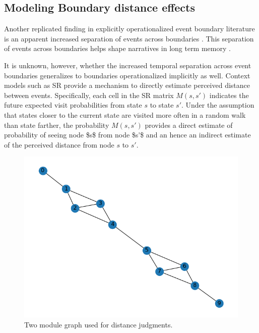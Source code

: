 \subsection*{Modeling Boundary distance effects}
Another replicated finding in explicitly operationalized event boundary literature is an apparent increased separation of events across boundaries \parencite{horner2016role,brunec2018boundaries,dubrow2013influence, ezzyat2011constitutes, heusser2018perceptual}. This separation of events across boundaries helps shape narratives in long term memory \parencite{clewett2019transcending}.

It is unknown, however, whether the increased temporal separation across event boundaries generalizes to boundaries operationalized implicitly as well. Context models such as SR provide a mechanism to directly estimate perceived distance between events. Specifically, each cell in the SR matrix $M(s, s')$ indicates the future expected visit probabilities from state $s$ to state $s'$. Under the assumption that states closer to the current state are visited more often in a random walk than state farther, the probability $M(s, s')$ provides a direct estimate \ac{of probability of seeing node $s$ from node $s'$ and an hence an indirect estimate of the perceived distance} from node $s$ to $s'$. 

\begin{figure}[ht]
    \centering
    \includegraphics[width = \textwidth]{chapter_notebooks/chapter_3/figures/two_module_graph.png}
    \caption{Two module graph used for distance judgments.}
    \label{fig:two_module_graph}
\end{figure}

